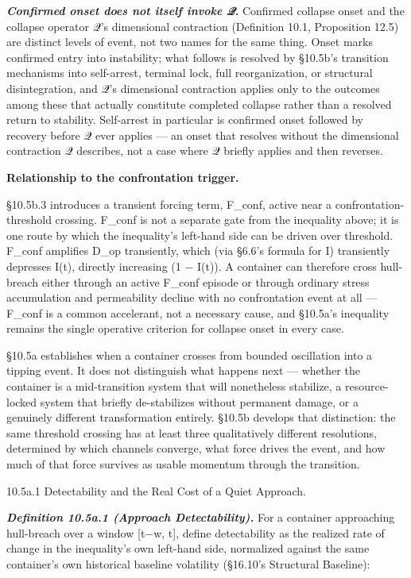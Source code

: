 \documentclass[
]{article}
\begin{document}
\emph{\textbf{Confirmed onset does not itself invoke 𝒬.}} Confirmed
collapse onset and the collapse operator 𝒬's dimensional contraction
(Definition 10.1, Proposition 12.5) are distinct levels of event, not
two names for the same thing. Onset marks confirmed entry into
instability; what follows is resolved by §10.5b's transition mechanisms
into self-arrest, terminal lock, full reorganization, or structural
disintegration, and 𝒬's dimensional contraction applies only to the
outcomes among these that actually constitute completed collapse rather
than a resolved return to stability. Self-arrest in particular is
confirmed onset followed by recovery before 𝒬 ever applies --- an onset
that resolves without the dimensional contraction 𝒬 describes, not a
case where 𝒬 briefly applies and then reverses.

\textbf{Relationship to the confrontation trigger.}

§10.5b.3 introduces a transient forcing term, F\_conf, active near a
confrontation-threshold crossing. F\_conf is not a separate gate from
the inequality above; it is one route by which the inequality's
left-hand side can be driven over threshold. F\_conf amplifies D\_op
transiently, which (via §6.6's formula for I) transiently depresses
I(t), directly increasing (1 − I(t)). A container can therefore cross
hull-breach either through an active F\_conf episode or through ordinary
stress accumulation and permeability decline with no confrontation event
at all --- F\_conf is a common accelerant, not a necessary cause, and
§10.5a's inequality remains the single operative criterion for collapse
onset in every case.

§10.5a establishes when a container crosses from bounded oscillation
into a tipping event. It does not distinguish what happens next ---
whether the container is a mid-transition system that will nonetheless
stabilize, a resource-locked system that briefly de-stabilizes without
permanent damage, or a genuinely different transformation entirely.
§10.5b develops that distinction: the same threshold crossing has at
least three qualitatively different resolutions, determined by which
channels converge, what force drives the event, and how much of that
force survives as usable momentum through the transition.

10.5a.1 Detectability and the Real Cost of a Quiet Approach.

\emph{\textbf{Definition 10.5a.1 (Approach Detectability).}} For a
container approaching hull-breach over a window {[}t−w, t{]}, define
detectability as the realized rate of change in the inequality's own
left-hand side, normalized against the same container's own historical
baseline volatility (§16.10's Structural Baseline):
\end{document}

